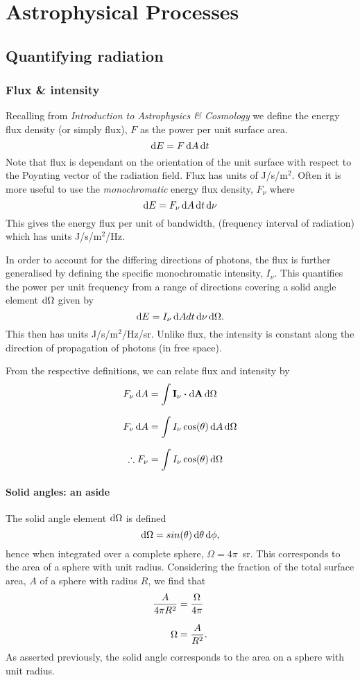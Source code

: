 \chapter{Astrophysical Processes}
\minitoc
\pagebreak
\section{Quantifying radiation}
\subsection{Flux \& intensity}
Recalling from \textit{Introduction to Astrophysics \& Cosmology} we define the energy flux density (or simply flux), $F$ as the power per unit surface area.
%
$$ \mathop{}\!\mathrm{d} E = F \mathop{}\!\mathrm{d} A \mathop{}\!\mathrm{d} t $$
%
Note that flux is dependant on the orientation of the unit surface with respect to the Poynting vector of the radiation field.
 Flux has units of J/s/m$^2$.
 Often it is more useful to use the \emph{monochromatic} energy flux density, $F_\nu$ where
%
\begin{equation}
	\mathop{}\!\mathrm{d} E = F_\nu \mathop{}\!\mathrm{d} A \mathop{}\!\mathrm{d} t \mathop{}\!\mathrm{d} \nu
	\label{eq:def_flux}
\end{equation}
%
This gives the energy flux per unit of bandwidth, (frequency interval of radiation) which has units J/s/m$^2$/Hz.
\par 
In order to account for the differing directions of photons, the flux is further generalised by defining the specific monochromatic intensity, $I_\nu$.
 This quantifies the power per unit frequency from a range of directions covering a solid angle element $\mathop{}\!\mathrm{d} \Omega$ given by
%
\begin{equation}
	\mathop{}\!\mathrm{d} E = I_\nu \mathop{}\!\mathrm{d} A dt \mathop{}\!\mathrm{d} \nu \mathop{}\!\mathrm{d} \Omega.
	\label{eq:def_intensity}
\end{equation}
%
This then has units J/s/m$^2$/Hz/sr.
 Unlike flux, the intensity is constant along the direction of propagation of photons (in free space).
\par
From the respective definitions, we can relate flux and intensity by
%
\begin{align*}
	F_\nu \diff A &= \int \mathbf{I_\nu} \dotp \mathbf{\diff A} \diff \Omega
	\linedrop
	F_\nu \diff A &= \int I_\nu \cos(\theta) \diff A \diff \Omega
	\linedrop
	\therefore F_\nu &= \int I_\nu \cos(\theta) \diff \Omega
\end{align*}
%

\subsubsection{Solid angles: an aside}
The solid angle element $\mathop{}\!\mathrm{d} \Omega$ is defined
%
$$ \mathop{}\!\mathrm{d} \Omega = sin(\theta) \mathop{}\!\mathrm{d} \theta \mathop{}\!\mathrm{d} \phi , $$
%
hence when integrated over a complete sphere, $\Omega = 4\pi$~sr.
 This corresponds to the area of a sphere with unit radius.
 Considering the fraction of the total surface area, $A$ of a sphere with radius $R$, we find that
%
\begin{align}
	\frac{A}{4\pi R^2} &= \frac{\Omega}{4\pi}
	\linedrop
	\Omega &= \frac{A}{R^2}.
	\label{eq:solid_angle}
\end{align}
%
As asserted previously, the solid angle corresponds to the area on a sphere with unit radius.
%
